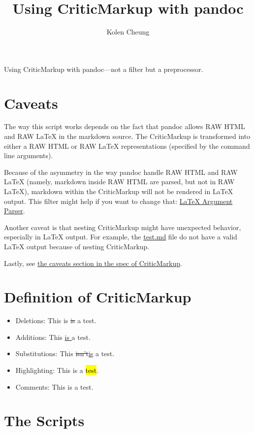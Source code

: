 \documentclass[]{article}
\title{Using CriticMarkup with pandoc}
\author{Kolen Cheung}
\date{}
\providecommand{\tightlist}{%
  \setlength{\itemsep}{0pt}\setlength{\parskip}{0pt}}
\begin{document}
\maketitle

Using CriticMarkup with pandoc---not a filter but a preprocessor.

\section{Caveats}\label{caveats}

The way this script works depends on the fact that pandoc allows RAW
HTML and RAW LaTeX in the markdown source. The CriticMarkup is
transformed into either a RAW HTML or RAW LaTeX representations
(specified by the command line arguments).

Because of the asymmetry in the way pandoc handle RAW HTML and RAW LaTeX
(namely, markdown inside RAW HTML are parsed, but not in RAW LaTeX),
markdown within the CriticMarkup will not be rendered in LaTeX output.
This filter might help if you want to change that:
\href{https://gist.github.com/mpickering/f1718fcdc4c56273ed52}{LaTeX
Argument Parser}.

Another caveat is that nesting CriticMarkup might have unexpected
behavior, especially in LaTeX output. For example, the \url{test.md}
file do not have a valid LaTeX output because of nesting CriticMarkup.

Lastly, see \href{http://criticmarkup.com/spec.php\#caveats}{the caveats
section in the spec of CriticMarkup}.

\section{Definition of CriticMarkup}\label{definition-of-criticmarkup}

\begin{itemize}
\tightlist
\item
  Deletions: This is \st{is }a test.
\item
  Additions: This \underline{is }a test.
\item
  Substitutions: This \st{isn't}\underline{is} a test.
\item
  Highlighting: This is a \hl{test}.
\item
  Comments: This is a test.
\end{itemize}

\section{The Scripts}\label{the-scripts}
\end{document}
